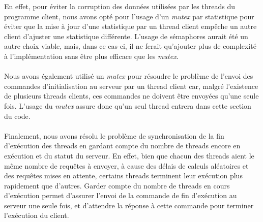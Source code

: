 \documentclass[11pt]{article}
\begin{document}
En effet, pour éviter la corruption des données utilisées par les threads du programme client, nous avons opté pour l'usage d'un \emph{mutex} 
par statistique pour éviter que la mise à jour d'une statistique par un thread client empêche un autre client d'ajuster une statistique 
différente. L'usage de sémaphores aurait été un autre choix viable, mais, dans ce cas-ci, il ne ferait qu'ajouter plus de complexité à 
l'implémentation sans être plus efficace que les \emph{mutex}.\\
\\
Nous avons également utilisé un \emph{mutex} pour résoudre le problème de l’envoi des commandes d’initialisation au serveur par un thread 
client car, malgré l’existence de plusieurs threads clients, ces commandes ne doivent être envoyées qu’une seule fois. L’usage du \emph{mutex} 
assure donc qu’un seul thread entrera dans cette section du code.\\ 
\\
Finalement, nous avons résolu le problème de synchronisation de la fin d’exécution des threads en gardant compte du nombre de threads encore en 
exécution et du statut du serveur. En effet, bien que chacun des threads aient le même nombre de requêtes à envoyer, à cause des délais de 
calculs aléatoires et des requêtes mises en attente, certains threads terminent leur exécution plus rapidement que d’autres. Garder compte du 
nombre de threads en cours d’exécution permet d’assurer l’envoi de la commande de fin d’exécution au serveur une seule fois, et d’attendre la 
réponse à cette commande pour terminer l’exécution du client.\\ 
\\
\end{document}
